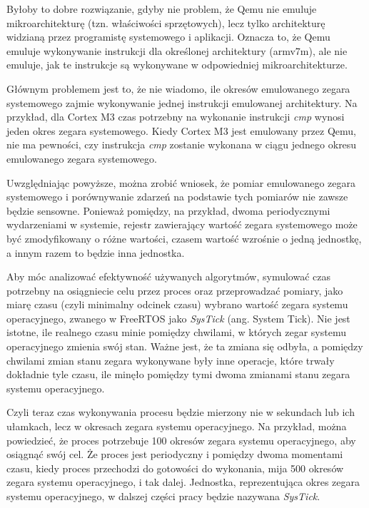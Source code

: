 \documentclass[../../main]{subfiles}
\begin{document}
Byłoby to dobre rozwiązanie, gdyby nie problem, że Qemu nie emuluje mikroarchitekturę (tzn. właściwości sprzętowych), lecz tylko architekturę widzianą przez programistę systemowego i aplikacji. Oznacza to, że Qemu emuluje wykonywanie instrukcji dla określonej architektury (\acrshort{arm}v7\acrshort{m}), ale nie emuluje, jak te instrukcje są wykonywane w odpowiedniej mikroarchitekturze.

Głównym problemem jest to, że nie wiadomo, ile okresów emulowanego zegara systemowego zajmie wykonywanie jednej instrukcji emulowanej architektury. Na przykład, dla Cortex M3 czas potrzebny na wykonanie instrukcji \textit{cmp} wynosi jeden okres zegara systemowego. Kiedy Cortex M3 jest emulowany przez Qemu, nie ma pewności, czy instrukcja \textit{cmp} zostanie wykonana w ciągu jednego okresu emulowanego zegara systemowego.

Uwzględniając powyższe, można zrobić wniosek, że pomiar emulowanego zegara systemowego i porównywanie zdarzeń na podstawie tych pomiarów nie zawsze będzie sensowne. Ponieważ pomiędzy, na przykład, dwoma periodycznymi wydarzeniami w systemie, rejestr zawierający wartość zegara systemowego może być zmodyfikowany o różne wartości, czasem wartość wzrośnie o jedną jednostkę, a innym razem to będzie inna jednostka.

Aby móc analizować efektywność używanych algorytmów, symulować czas potrzebny na osiągniecie celu przez proces oraz przeprowadzać pomiary, jako miarę czasu (czyli minimalny odcinek czasu) wybrano wartość zegara systemu operacyjnego, zwanego w FreeRTOS jako \textit{SysTick} (ang. System Tick). Nie jest istotne, ile realnego czasu minie pomiędzy chwilami, w których zegar systemu operacyjnego zmienia swój stan. Ważne jest, że ta zmiana się odbyła, a pomiędzy chwilami zmian stanu zegara wykonywane były inne operacje, które trwały dokładnie tyle czasu, ile minęło pomiędzy tymi dwoma zmianami stanu zegara systemu operacyjnego.

Czyli teraz czas wykonywania procesu będzie mierzony nie w sekundach lub ich ułamkach, lecz w okresach zegara systemu operacyjnego. Na przykład, można powiedzieć, że proces potrzebuje 100 okresów zegara systemu operacyjnego, aby osiągnąć swój cel. Że proces jest periodyczny i pomiędzy dwoma momentami czasu, kiedy proces przechodzi do gotowości do wykonania, mija 500 okresów zegara systemu operacyjnego, i tak dalej. Jednostka, reprezentująca okres zegara systemu operacyjnego, w dalszej części pracy będzie nazywana \textit{SysTick}.
\end{document}
